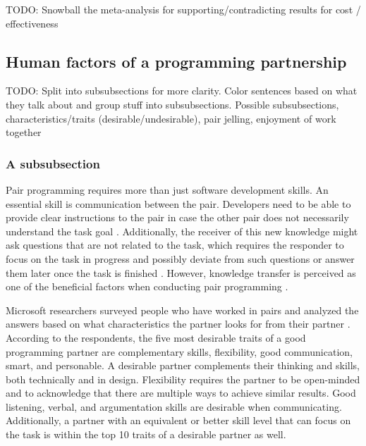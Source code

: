 \documentclass[conference]{IEEEtran}
\newcommand{\todo}[1]{{\color{red} TODO: {#1}}}
\begin{document}
\todo{Snowball the meta-analysis \cite{Hannay2009effectiveness} for supporting/contradicting results for cost / effectiveness}

\subsection{Human factors of a programming partnership}

\todo{Split into subsubsections for more clarity. Color sentences based on what they talk about and group stuff into subsubsections. Possible subsubsections, characteristics/traits (desirable/undesirable), pair jelling, enjoyment of work together}

\subsubsection{A subsubsection}

Pair programming requires more than just software development skills. An essential skill is communication between the pair. Developers need to be able to provide clear instructions to the pair in case the other pair does not necessarily understand the task goal \cite{10.1145/2652524.2652529}. Additionally, the receiver of this new knowledge might ask questions that are not related to the task, which requires the responder to focus on the task in progress and possibly deviate from such questions or answer them later once the task is finished \cite{10.1145/2652524.2652529}. However, knowledge transfer is perceived as one of the beneficial factors when conducting pair programming \cite{10.1145/2652524.2652529}.

Microsoft researchers surveyed people who have worked in pairs and analyzed the answers based on what characteristics the partner looks for from their partner \cite{10.1145/1414004.1414026}. According to the respondents, the five most desirable traits of a good programming partner are complementary skills, flexibility, good communication, smart, and personable. A desirable partner complements their thinking and skills, both technically and in design. Flexibility requires the partner to be open-minded and to acknowledge that there are multiple ways to achieve similar results. Good listening, verbal, and argumentation skills are desirable when communicating. Additionally, a partner with an equivalent or better skill level that can focus on the task is within the top 10 traits of a desirable partner as well.
\end{document}
